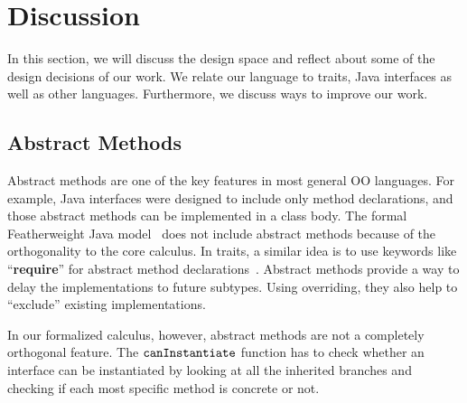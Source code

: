 \section{Discussion}\label{sec:discussion}
In this section, we will discuss the design space and reflect about some of the design decisions of our work. We relate our language to traits, Java interfaces as well as other languages. Furthermore, we discuss ways to improve our work.


\subsection{Abstract Methods}
Abstract methods are one of the key features in most general OO languages. For example, Java interfaces were designed
to include only method declarations, and those abstract methods can be implemented in a class body. 
The formal Featherweight Java model~\cite{Igarashi01FJ} does not include abstract methods because of the orthogonality
to the core calculus. In traits, a
similar idea is to use keywords like ``\textbf{require}'' for abstract method declarations~\cite{scharli03traits}.
Abstract methods provide a way to
delay the implementations to future subtypes. Using overriding, they also help to ``exclude'' existing implementations.

In our formalized calculus, however, abstract methods are not a completely orthogonal feature. The $\texttt{canInstantiate}$ function
has to check whether an interface can be instantiated by looking at all the inherited branches and checking if each most specific method is concrete or not.

